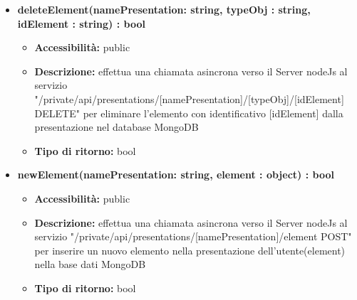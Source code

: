 {{\begin{itemize}
		\item \textbf{deleteElement(namePresentation: string, typeObj : string, idElement : string) : bool}
			\begin{itemize}
			\item \textbf{Accessibilit\`{a}:} public
			\item \textbf{Descrizione:} effettua una chiamata asincrona verso il Server nodeJs al servizio "/private/api/presentations/[namePresentation]/[typeObj]/[idElement] DELETE" per eliminare l'elemento con identificativo [idElement] dalla presentazione nel database MongoDB
			\item \textbf{Tipo di ritorno:} bool
			\end{itemize}
			
		\item \textbf{newElement(namePresentation: string, element : object) : bool}
			\begin{itemize}
			\item \textbf{Accessibilit\`{a}:} public
			\item \textbf{Descrizione:} effettua una chiamata asincrona verso il Server nodeJs al servizio "/private/api/presentations/[namePresentation]/element POST" per inserire un nuovo elemento nella presentazione dell'utente(element) nella base dati MongoDB
 			\item \textbf{Tipo di ritorno:} bool
			\end{itemize}

		\end{itemize}
	}
}
	
	
	
	
	
	
	
	
	
	
	
	
	
	
	
